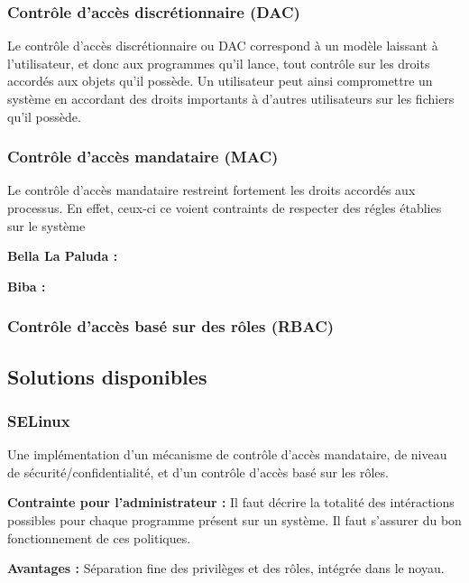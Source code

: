 \subsubsection{Contrôle d'accès discrétionnaire (DAC)}

Le contrôle d'accès discrétionnaire ou DAC correspond à un modèle laissant à l'utilisateur, et donc aux programmes qu'il lance, tout contrôle sur les droits accordés aux objets qu'il possède. Un utilisateur peut ainsi compromettre un système en accordant des droits importants à d'autres utilisateurs sur les fichiers qu'il possède.

\subsubsection{Contrôle d'accès mandataire (MAC)}

Le contrôle d'accès mandataire restreint fortement les droits accordés aux processus. En effet, ceux-ci ce voient contraints de respecter des régles établies sur le système

\textbf{Bella La Paluda :}

\textbf{Biba :}

\subsubsection{Contrôle d'accès basé sur des rôles (RBAC)}

\subsection{Solutions disponibles}

\subsubsection{SELinux}

Une implémentation d'un mécanisme de contrôle d'accès mandataire, de niveau de sécurité/confidentialité, et d'un contrôle d'accès basé sur les rôles.

\begin{list}{}{}
 \item \textbf{Contrainte pour l'administrateur :} Il faut décrire la totalité des intéractions possibles pour chaque programme présent sur un système. Il faut s'assurer du bon fonctionnement de ces politiques.

 \item \textbf{Avantages :} Séparation fine des privilèges et des rôles, intégrée dans le noyau.
\end{list}



